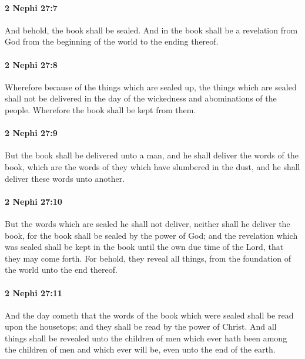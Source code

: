 		\paragraph{2 Nephi 27:7} %
			\label{2NEPHI-27-7}

			And behold, the book shall be sealed.
			And in the book shall be a revelation from God
			from the beginning of the world to the ending thereof.

		\paragraph{2 Nephi 27:8} %
			\label{2NEPHI-27-8}

			Wherefore because of the things which are sealed up,
			the things which are sealed shall not be delivered
			in the day of the wickedness and abominations of the people.
			Wherefore the book shall be kept from them.

		\paragraph{2 Nephi 27:9} %
			\label{2NEPHI-27-9}

			But the book shall be delivered unto a man,
			and he shall deliver the words of the book,
			which are the words of they which have slumbered in the dust,
			and he shall deliver these words unto another.

		\paragraph{2 Nephi 27:10} %
			\label{2NEPHI-27-10}

			But the words which are sealed he shall not deliver,
			neither shall he deliver the book,
			for the book shall be sealed by the power of God;
			and the revelation which was sealed shall be kept in the book
			until the own due time of the Lord,
			that they may come forth.
			For behold, they reveal all things,
			from the foundation of the world unto the end thereof.

		\paragraph{2 Nephi 27:11} %
			\label{2NEPHI-27-11}

			And the day cometh that the words of the book which were sealed
			shall be read upon the housetops;
			and they shall be read by the power of Christ.
			And all things shall be revealed unto the children of men
			which ever hath been among the children of men
			and which ever will be, even unto the end of the earth.

